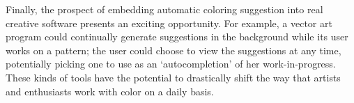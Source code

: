Finally, the prospect of embedding automatic coloring suggestion into real creative software presents an exciting opportunity. For example, a vector art program could continually generate suggestions in the background while its user works on a pattern; the user could choose to view the suggestions at any time, potentially picking one to use as an `autocompletion' of her work-in-progress. These kinds of tools have the potential to drastically shift the way that artists and enthusiasts work with color on a daily basis. 

%
%
